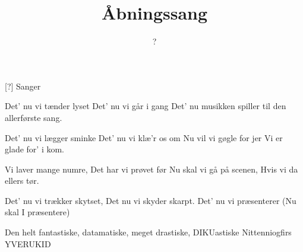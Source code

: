 \documentclass[a4paper,11pt]{article}
\title{Åbningssang}
\author{?}
\begin{document}
\maketitle

\begin{roles}
[?] Sanger
\end{roles}

\begin{song}
  Det' nu vi tænder lyset
  Det' nu vi går i gang
  Det' nu musikken spiller
  til den allerførste sang.

  Det' nu vi lægger sminke
  Det' nu vi klæ'r os om
  Nu vil vi gøgle for jer
  Vi er glade for' i kom.

  Vi laver mange numre,
  Det har vi prøvet før
  Nu skal vi gå på scenen,
  Hvis vi da ellers tør.

  Det' nu vi trækker skytset,
  Det nu vi skyder skarpt.
  Det' nu vi præsenterer
  (Nu skal I præsentere)

  Den helt fantastiske, datamatiske, meget drastiske, DIKUastiske
  Nittenniogfirs YVERUKID
\end{song}
\end{document}
